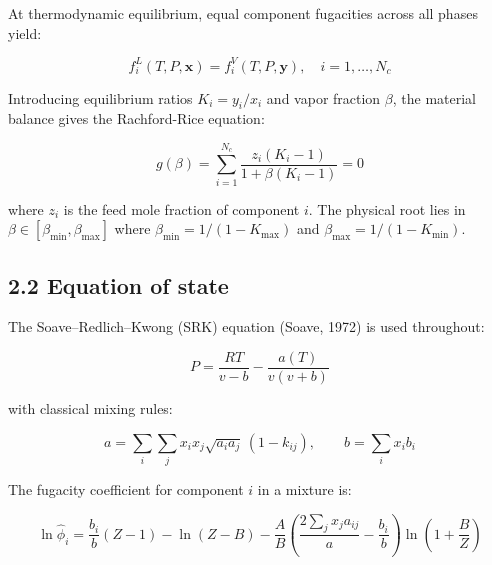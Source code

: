 \documentclass[review,3p]{custom}
\begin{document}
At thermodynamic equilibrium, equal component fugacities across all phases yield:

\begin{equation}

f_i^L(T, P, \mathbf{x}) = f_i^V(T, P, \mathbf{y}), \quad i = 1, \ldots, N_c

\end{equation}

Introducing equilibrium ratios $K_i = y_i / x_i$ and vapor fraction $\beta$, the
material balance gives the Rachford-Rice equation:

\begin{equation}

g(\beta) = \sum_{i=1}^{N_c} \frac{z_i (K_i - 1)}{1 + \beta(K_i - 1)} = 0

\end{equation}

where $z_i$ is the feed mole fraction of component $i$. The physical root lies in
$\beta \in [\beta_{\min}, \beta_{\max}]$ where $\beta_{\min} = 1/(1-K_{\max})$ and
$\beta_{\max} = 1/(1-K_{\min})$.

\subsection{2.2 Equation of state}

The Soave–Redlich–Kwong (SRK) equation (Soave, 1972) is used throughout:

\begin{equation}

P = \frac{RT}{v-b} - \frac{a(T)}{v(v+b)}

\end{equation}

with classical mixing rules:

\begin{equation}

a = \sum_i \sum_j x_i x_j \sqrt{a_i a_j}\,(1-k_{ij}), \qquad b = \sum_i x_i b_i

\end{equation}

The fugacity coefficient for component $i$ in a mixture is:

\begin{equation}

\ln \hat\phi_i = \frac{b_i}{b}(Z-1) - \ln(Z-B) - \frac{A}{B}\left(\frac{2\sum_j x_j a_{ij}}{a} - \frac{b_i}{b}\right) \ln\left(1 + \frac{B}{Z}\right)

\end{equation}
\end{document}
